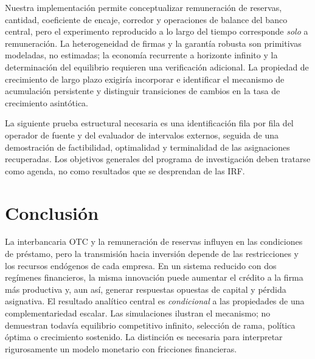 Nuestra implementación permite conceptualizar remuneración
de reservas, cantidad, coeficiente de encaje, corredor y
operaciones de balance del banco central, pero el
experimento reproducido a lo largo del tiempo
corresponde \emph{solo} a remuneración.
La heterogeneidad de firmas y la garantía robusta son
primitivas modeladas, no estimadas; la economía
recurrente a horizonte infinito y la determinación
del equilibrio requieren una verificación adicional.
La propiedad de crecimiento de largo plazo exigiría
incorporar e identificar el mecanismo de acumulación
persistente y distinguir transiciones de cambios
en la tasa de crecimiento asintótica.

La siguiente prueba estructural necesaria es una
identificación fila por fila del operador de fuente y del
evaluador de intervalos externos, seguida de una demostración
de factibilidad, optimalidad y terminalidad de las
asignaciones recuperadas. Los objetivos generales del programa
de investigación deben tratarse como agenda, no como
resultados que se desprendan de las IRF.

\section{Conclusión}
La interbancaria OTC y la remuneración de reservas
influyen en las condiciones de préstamo, pero la
transmisión hacia inversión depende de las restricciones
y los recursos endógenos de cada empresa. En un sistema
reducido con dos regímenes financieros, la misma innovación
puede aumentar el crédito a la firma más productiva y, aun
así, generar respuestas opuestas de capital y pérdida
asignativa. El resultado analítico central es
\emph{condicional} a las propiedades de una complementariedad
escalar. Las simulaciones ilustran el mecanismo; no
demuestran todavía equilibrio competitivo infinito,
selección de rama, política óptima o crecimiento sostenido.
La distinción es necesaria para interpretar rigurosamente
un modelo monetario con fricciones financieras.
